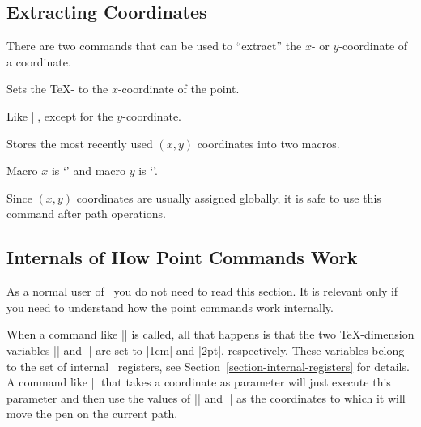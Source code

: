 \subsection{Extracting Coordinates}

There are two commands that can be used to ``extract'' the $x$- or
$y$-coordinate of a coordinate.

\begin{command}{\pgfextractx{}}
    Sets the \TeX- to the $x$-coordinate of the point.
\begin{codeexample}
\newdimen\mydim
\pgfextractx{\mydim}{\pgfpoint{2cm}{4pt}}
\end{codeexample}
\end{command}

\begin{command}{\pgfextracty{}}
    Like |\pgfextractx|, except for the $y$-coordinate.
\end{command}

\begin{command}{\pgfgetlastxy{}}
    Stores the most recently used $(x,y)$ coordinates into two macros.
\begin{codeexample}[]
\pgfpoint{2cm}{4cm}
\pgfgetlastxy{\macrox}{\macroy}
Macro $x$ is `\macrox' and macro $y$ is `\macroy'.
\end{codeexample}
    Since $(x,y)$ coordinates are usually assigned globally, it is safe to use
    this command after path operations.
\end{command}


\subsection{Internals of How Point Commands Work}
\label{section-internal-pointcmds}

As a normal user of \pgfname\ you do not need to read this section. It is
relevant only if you need to understand how the point commands work internally.

When a command like |\pgfpoint{1cm}{2pt}| is called, all that happens is that
the two \TeX-dimension variables |\pgf@x| and |\pgf@y| are set to |1cm| and
|2pt|, respectively. These variables belong to the set of internal \pgfname\
registers, see Section~\ref{section-internal-registers} for details. A command
like |\pgfpathmoveto| that takes a coordinate as parameter will just execute
this parameter and then use the values of |\pgf@x| and |\pgf@y| as the
coordinates to which it will move the pen on the current path.

